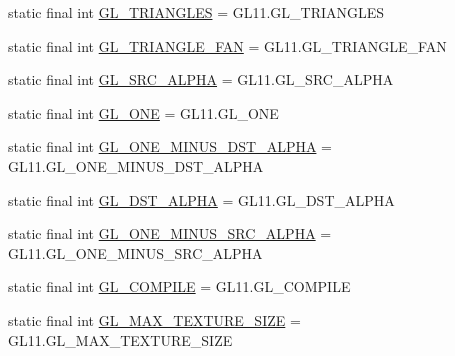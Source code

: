 \begin{DoxyCompactItemize}
\item 
static final int \mbox{\hyperlink{interfaceorg_1_1newdawn_1_1slick_1_1opengl_1_1renderer_1_1_s_g_l_a359644a0c6698c81d60ce0cd0381cc5d}{G\+L\+\_\+\+T\+R\+I\+A\+N\+G\+L\+ES}} = G\+L11.\+G\+L\+\_\+\+T\+R\+I\+A\+N\+G\+L\+ES
\item 
static final int \mbox{\hyperlink{interfaceorg_1_1newdawn_1_1slick_1_1opengl_1_1renderer_1_1_s_g_l_a09849200be50a0af4505eec97d7d87b9}{G\+L\+\_\+\+T\+R\+I\+A\+N\+G\+L\+E\+\_\+\+F\+AN}} = G\+L11.\+G\+L\+\_\+\+T\+R\+I\+A\+N\+G\+L\+E\+\_\+\+F\+AN
\item 
static final int \mbox{\hyperlink{interfaceorg_1_1newdawn_1_1slick_1_1opengl_1_1renderer_1_1_s_g_l_a442941d2689f2e105f3dc3f01dc62373}{G\+L\+\_\+\+S\+R\+C\+\_\+\+A\+L\+P\+HA}} = G\+L11.\+G\+L\+\_\+\+S\+R\+C\+\_\+\+A\+L\+P\+HA
\item 
static final int \mbox{\hyperlink{interfaceorg_1_1newdawn_1_1slick_1_1opengl_1_1renderer_1_1_s_g_l_a0cbbeabc33e7b4c3bcc7d9b76e5dae38}{G\+L\+\_\+\+O\+NE}} = G\+L11.\+G\+L\+\_\+\+O\+NE
\item 
static final int \mbox{\hyperlink{interfaceorg_1_1newdawn_1_1slick_1_1opengl_1_1renderer_1_1_s_g_l_a89aee6181bad4c1ac89511028fefd4f6}{G\+L\+\_\+\+O\+N\+E\+\_\+\+M\+I\+N\+U\+S\+\_\+\+D\+S\+T\+\_\+\+A\+L\+P\+HA}} = G\+L11.\+G\+L\+\_\+\+O\+N\+E\+\_\+\+M\+I\+N\+U\+S\+\_\+\+D\+S\+T\+\_\+\+A\+L\+P\+HA
\item 
static final int \mbox{\hyperlink{interfaceorg_1_1newdawn_1_1slick_1_1opengl_1_1renderer_1_1_s_g_l_a4e54d6d93d4246d52d4ecc7bb11eb921}{G\+L\+\_\+\+D\+S\+T\+\_\+\+A\+L\+P\+HA}} = G\+L11.\+G\+L\+\_\+\+D\+S\+T\+\_\+\+A\+L\+P\+HA
\item 
static final int \mbox{\hyperlink{interfaceorg_1_1newdawn_1_1slick_1_1opengl_1_1renderer_1_1_s_g_l_a1a1472e051846ebde55c8982b7f3fdd8}{G\+L\+\_\+\+O\+N\+E\+\_\+\+M\+I\+N\+U\+S\+\_\+\+S\+R\+C\+\_\+\+A\+L\+P\+HA}} = G\+L11.\+G\+L\+\_\+\+O\+N\+E\+\_\+\+M\+I\+N\+U\+S\+\_\+\+S\+R\+C\+\_\+\+A\+L\+P\+HA
\item 
static final int \mbox{\hyperlink{interfaceorg_1_1newdawn_1_1slick_1_1opengl_1_1renderer_1_1_s_g_l_a79433483d26515f3803e1b3d8ec984bb}{G\+L\+\_\+\+C\+O\+M\+P\+I\+LE}} = G\+L11.\+G\+L\+\_\+\+C\+O\+M\+P\+I\+LE
\item 
static final int \mbox{\hyperlink{interfaceorg_1_1newdawn_1_1slick_1_1opengl_1_1renderer_1_1_s_g_l_a9f7bec41286180d52a2cdd965642c385}{G\+L\+\_\+\+M\+A\+X\+\_\+\+T\+E\+X\+T\+U\+R\+E\+\_\+\+S\+I\+ZE}} = G\+L11.\+G\+L\+\_\+\+M\+A\+X\+\_\+\+T\+E\+X\+T\+U\+R\+E\+\_\+\+S\+I\+ZE
\item 

\end{DoxyCompactItemize}
